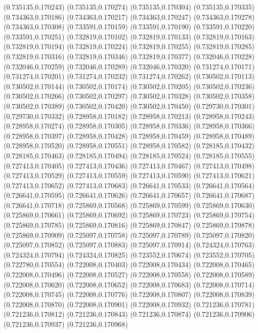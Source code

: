 (0.735135,0.170243)
(0.735135,0.170274)
(0.735135,0.170304)
(0.735135,0.170335)
(0.734363,0.170186)
(0.734363,0.170217)
(0.734363,0.170247)
(0.734363,0.170278)
(0.734363,0.170308)
(0.733591,0.170159)
(0.733591,0.170190)
(0.733591,0.170220)
(0.733591,0.170251)
(0.732819,0.170102)
(0.732819,0.170133)
(0.732819,0.170163)
(0.732819,0.170194)
(0.732819,0.170224)
(0.732819,0.170255)
(0.732819,0.170285)
(0.732819,0.170316)
(0.732819,0.170346)
(0.732819,0.170377)
(0.732046,0.170228)
(0.732046,0.170259)
(0.732046,0.170289)
(0.732046,0.170320)
(0.731274,0.170171)
(0.731274,0.170201)
(0.731274,0.170232)
(0.731274,0.170262)
(0.730502,0.170113)
(0.730502,0.170144)
(0.730502,0.170174)
(0.730502,0.170205)
(0.730502,0.170236)
(0.730502,0.170266)
(0.730502,0.170297)
(0.730502,0.170328)
(0.730502,0.170358)
(0.730502,0.170389)
(0.730502,0.170420)
(0.730502,0.170450)
(0.729730,0.170301)
(0.729730,0.170332)
(0.728958,0.170182)
(0.728958,0.170213)
(0.728958,0.170243)
(0.728958,0.170274)
(0.728958,0.170305)
(0.728958,0.170336)
(0.728958,0.170366)
(0.728958,0.170397)
(0.728958,0.170428)
(0.728958,0.170459)
(0.728958,0.170489)
(0.728958,0.170520)
(0.728958,0.170551)
(0.728958,0.170582)
(0.728185,0.170432)
(0.728185,0.170463)
(0.728185,0.170494)
(0.728185,0.170524)
(0.728185,0.170555)
(0.727413,0.170405)
(0.727413,0.170436)
(0.727413,0.170467)
(0.727413,0.170498)
(0.727413,0.170529)
(0.727413,0.170559)
(0.727413,0.170590)
(0.727413,0.170621)
(0.727413,0.170652)
(0.727413,0.170683)
(0.726641,0.170533)
(0.726641,0.170564)
(0.726641,0.170595)
(0.726641,0.170626)
(0.726641,0.170657)
(0.726641,0.170687)
(0.726641,0.170718)
(0.725869,0.170568)
(0.725869,0.170599)
(0.725869,0.170630)
(0.725869,0.170661)
(0.725869,0.170692)
(0.725869,0.170723)
(0.725869,0.170754)
(0.725869,0.170785)
(0.725869,0.170816)
(0.725869,0.170847)
(0.725869,0.170878)
(0.725869,0.170909)
(0.725097,0.170758)
(0.725097,0.170789)
(0.725097,0.170820)
(0.725097,0.170852)
(0.725097,0.170883)
(0.725097,0.170914)
(0.724324,0.170763)
(0.724324,0.170794)
(0.724324,0.170825)
(0.723552,0.170674)
(0.723552,0.170705)
(0.722780,0.170554)
(0.722008,0.170403)
(0.722008,0.170434)
(0.722008,0.170465)
(0.722008,0.170496)
(0.722008,0.170527)
(0.722008,0.170558)
(0.722008,0.170589)
(0.722008,0.170620)
(0.722008,0.170652)
(0.722008,0.170683)
(0.722008,0.170714)
(0.722008,0.170745)
(0.722008,0.170776)
(0.722008,0.170807)
(0.722008,0.170839)
(0.722008,0.170870)
(0.722008,0.170901)
(0.722008,0.170932)
(0.721236,0.170781)
(0.721236,0.170812)
(0.721236,0.170843)
(0.721236,0.170874)
(0.721236,0.170906)
(0.721236,0.170937)
(0.721236,0.170968)
